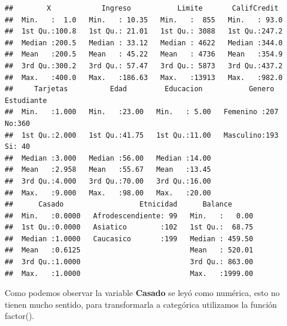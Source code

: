 \documentclass[
  12pt,
]{book}
\newenvironment{Shaded}{\begin{snugshade}}{\end{snugshade}}
\newcommand{\AttributeTok}[1]{\textcolor[rgb]{0.77,0.63,0.00}{#1}}
\newcommand{\DecValTok}[1]{\textcolor[rgb]{0.00,0.00,0.81}{#1}}
\newcommand{\DocumentationTok}[1]{\textcolor[rgb]{0.56,0.35,0.01}{\textbf{\textit{#1}}}}
\newcommand{\FunctionTok}[1]{\textcolor[rgb]{0.00,0.00,0.00}{#1}}
\newcommand{\NormalTok}[1]{#1}
\newcommand{\OtherTok}[1]{\textcolor[rgb]{0.56,0.35,0.01}{#1}}
\newcommand{\SpecialCharTok}[1]{\textcolor[rgb]{0.00,0.00,0.00}{#1}}
\newcommand{\StringTok}[1]{\textcolor[rgb]{0.31,0.60,0.02}{#1}}
\begin{document}
\begin{verbatim}
##        X            Ingreso           Limite       CalifCredit   
##  Min.   :  1.0   Min.   : 10.35   Min.   :  855   Min.   : 93.0  
##  1st Qu.:100.8   1st Qu.: 21.01   1st Qu.: 3088   1st Qu.:247.2  
##  Median :200.5   Median : 33.12   Median : 4622   Median :344.0  
##  Mean   :200.5   Mean   : 45.22   Mean   : 4736   Mean   :354.9  
##  3rd Qu.:300.2   3rd Qu.: 57.47   3rd Qu.: 5873   3rd Qu.:437.2  
##  Max.   :400.0   Max.   :186.63   Max.   :13913   Max.   :982.0  
##     Tarjetas          Edad         Educacion           Genero    Estudiante
##  Min.   :1.000   Min.   :23.00   Min.   : 5.00   Femenino :207   No:360    
##  1st Qu.:2.000   1st Qu.:41.75   1st Qu.:11.00   Masculino:193   Si: 40    
##  Median :3.000   Median :56.00   Median :14.00                             
##  Mean   :2.958   Mean   :55.67   Mean   :13.45                             
##  3rd Qu.:4.000   3rd Qu.:70.00   3rd Qu.:16.00                             
##  Max.   :9.000   Max.   :98.00   Max.   :20.00                             
##      Casado                  Etnicidad      Balance       
##  Min.   :0.0000   Afrodescendiente: 99   Min.   :   0.00  
##  1st Qu.:0.0000   Asiatico        :102   1st Qu.:  68.75  
##  Median :1.0000   Caucasico       :199   Median : 459.50  
##  Mean   :0.6125                          Mean   : 520.01  
##  3rd Qu.:1.0000                          3rd Qu.: 863.00  
##  Max.   :1.0000                          Max.   :1999.00
\end{verbatim}

Como podemos observar la variable \textbf{Casado} se leyó como numérica, esto no tienen mucho sentido, para transformarla a categórica utilizamos la función factor().

\begin{Shaded}
\end{Shaded}
\end{document}
